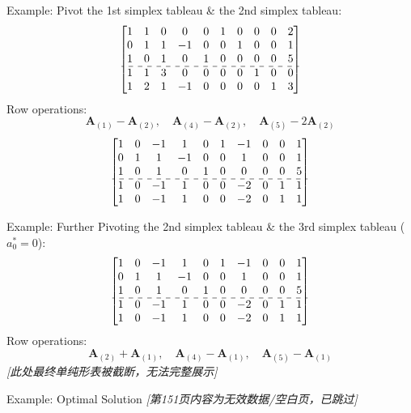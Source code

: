\documentclass[aspectratio=169,hyperref,UTF8,CJK]{beamer}
\begin{document}
\begin{frame}{Example: Pivot}
the 1st simplex tableau \& the 2nd simplex tableau:
\[
\begin{bmatrix}
1 & 1 & 0 & 0 & 0 & 1 & 0 & 0 & 0 & 2 \\
0 & 1 & 1 & -1 & 0 & 0 & 1 & 0 & 0 & 1 \\
1 & 0 & 1 & 0 & 1 & 0 & 0 & 0 & 0 & 5 \\
\hdashline 1 & 1 & 3 & 0 & 0 & 0 & 0 & 1 & 0 & 0 \\
1 & 2 & 1 & -1 & 0 & 0 & 0 & 0 & 1 & 3
\end{bmatrix}
\]
Row operations:
\[
\mathbf{A}_{(1)} - \mathbf{A}_{(2)}, \quad \mathbf{A}_{(4)} - \mathbf{A}_{(2)}, \quad \mathbf{A}_{(5)} - 2\mathbf{A}_{(2)}
\]
\[
\begin{bmatrix}
1 & 0 & -1 & 1 & 0 & 1 & -1 & 0 & 0 & 1 \\
0 & 1 & 1 & -1 & 0 & 0 & 1 & 0 & 0 & 1 \\
1 & 0 & 1 & 0 & 1 & 0 & 0 & 0 & 0 & 5 \\
\hdashline 1 & 0 & -1 & 1 & 0 & 0 & -2 & 0 & 1 & 1 \\
1 & 0 & -1 & 1 & 0 & 0 & -2 & 0 & 1 & 1
\end{bmatrix}
\]
\end{frame}

\begin{frame}{Example: Further Pivoting}
the 2nd simplex tableau \& the 3rd simplex tableau (\(a_0^* = 0\)):
\[
\begin{bmatrix}
1 & 0 & -1 & 1 & 0 & 1 & -1 & 0 & 0 & 1 \\
0 & 1 & 1 & -1 & 0 & 0 & 1 & 0 & 0 & 1 \\
1 & 0 & 1 & 0 & 1 & 0 & 0 & 0 & 0 & 5 \\
\hdashline 1 & 0 & -1 & 1 & 0 & 0 & -2 & 0 & 1 & 1 \\
1 & 0 & -1 & 1 & 0 & 0 & -2 & 0 & 1 & 1
\end{bmatrix}
\]
Row operations:
\[
\mathbf{A}_{(2)} + \mathbf{A}_{(1)}, \quad \mathbf{A}_{(4)} - \mathbf{A}_{(1)}, \quad \mathbf{A}_{(5)} - \mathbf{A}_{(1)}
\]
\textit{[此处最终单纯形表被截断，无法完整展示]}
\end{frame}

\begin{frame}{Example: Optimal Solution}
\textit{[第151页内容为无效数据/空白页，已跳过]}
\end{frame}

\end{document}
